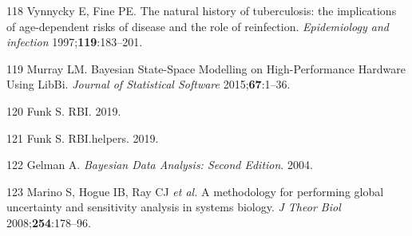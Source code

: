 \documentclass[11pt,twoside]{bristolthesis}
\begin{document}
  \leavevmode\hypertarget{ref-Vynnycky1997a}{}%
  118 Vynnycky E, Fine PE. The natural history of tuberculosis: the implications of age-dependent risks of disease and the role of reinfection. \emph{Epidemiology and infection} 1997;\textbf{119}:183--201.
  
  \leavevmode\hypertarget{ref-Murray2015}{}%
  119 Murray LM. Bayesian State-Space Modelling on High-Performance Hardware Using LibBi. \emph{Journal of Statistical Software} 2015;\textbf{67}:1--36.
  
  \leavevmode\hypertarget{ref-Funk:2019ud}{}%
  120 Funk S. RBI. 2019.
  
  \leavevmode\hypertarget{ref-Funk:2019uw}{}%
  121 Funk S. RBI.helpers. 2019.
  
  \leavevmode\hypertarget{ref-Gelman:nll_LBlw}{}%
  122 Gelman A. \emph{Bayesian Data Analysis: Second Edition}. 2004.
  
  \leavevmode\hypertarget{ref-Marino2009a}{}%
  123 Marino S, Hogue IB, Ray CJ \emph{et al.} A methodology for performing global uncertainty and sensitivity analysis in systems biology. \emph{J Theor Biol} 2008;\textbf{254}:178--96.


\end{document}
